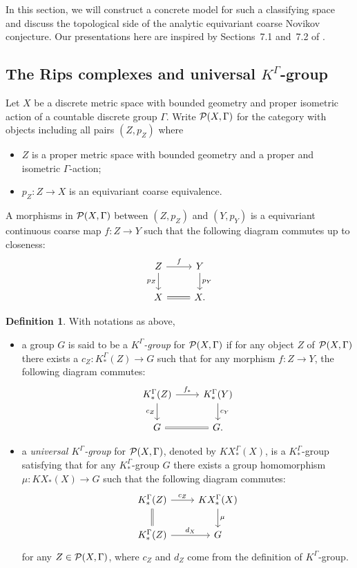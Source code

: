 \documentclass[11pt]{article}
\theoremstyle{definition}
\newtheorem{Def}{Definition}[section]
\theoremstyle{plain}
\def\Ga{\Gamma}
\begin{document}
In this section, we will construct a concrete model for such a classifying space and discuss the topological side of the analytic equivariant coarse Novikov conjecture. Our presentations here are inspired by Sections~7.1 and~7.2 of \cite{HIT2020}.

\subsection{The Rips complexes and universal $K^{\Ga}$-group}

Let $X$ be a discrete metric space with bounded geometry and proper isometric action of a countable discrete group $\Ga$. Write $\P(X,\Ga)$ for the category with objects including all pairs $(Z,p_Z)$ where
\begin{itemize}
\item[-] $Z$ is a proper metric space with bounded geometry and a proper and isometric $\Ga$-action;
\item[-] $p_Z:Z\to X$ is an equivariant coarse equivalence.
\end{itemize}
A morphisms in $\P(X,\Ga)$ between $(Z,p_Z)$ and $(Y,p_Y)$ is a equivariant continuous coarse map $f:Z\to Y$ such that the following diagram commutes up to closeness:
$$\begin{tikzcd}
Z \arrow[r, "f"] \arrow[d, "p_Z"'] & Y \arrow[d, "p_Y"] \\
X \arrow[r, Rightarrow, no head]   & X.                
\end{tikzcd}$$

\begin{Def}
With notations as above,
\begin{itemize}
\item[(1)]a group $G$ is said to be a \emph{$K^{\Ga}$-group} for $\P(X,\Ga)$ if for any object $Z$ of $\P(X,\Ga)$ there exists a $c_Z:K^{\Ga}_*(Z)\to G$ such that for any morphism $f:Z\to Y$, the following diagram commutes:
$$\begin{tikzcd}
K^{\Ga}_*(Z) \arrow[r, "f_*"] \arrow[d, "c_Z"'] & K_*^{\Ga}(Y) \arrow[d, "c_Y"] \\
G \arrow[r, Rightarrow, no head]   & G .                
\end{tikzcd}$$

\item[(2)]a \emph{universal $K^{\Ga}$-group} for $\P(X,\Ga)$, denoted by $KX^{\Ga}_*(X)$, is a $K^{\Ga}_*$-group satisfying that  for any $K^{\Ga}_*$-group $G$ there exists a group homomorphism $\mu:KX_*(X)\to G$ such that the following diagram commutes:
$$\begin{tikzcd}
K^{\Ga}_*(Z) \arrow[r, "c_Z"] \arrow[d,  Rightarrow, no head] & KX_*^{\Ga}(X) \arrow[d, "\mu"] \\
K_*^{\Ga}(Z) \arrow[r, "d_X"]              & G   
\end{tikzcd}$$
for any $Z\in \P(X,\Ga)$, where $c_Z$ and $d_Z$ come from the definition of $K^{\Ga}$-group.
\end{itemize}\end{Def}
\end{document}
